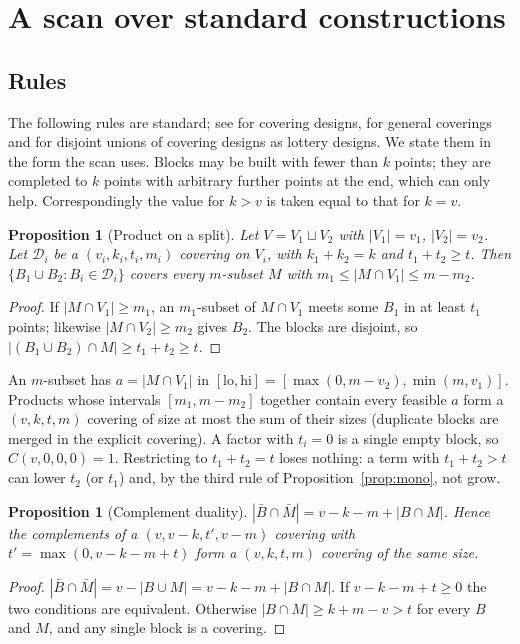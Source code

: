 \documentclass[11pt]{article}
\newtheorem{proposition}[lemma]{Proposition}
\theoremstyle{remark}
\begin{document}
\section{A scan over standard constructions}\label{sec:constructions}

\subsection{Rules}

The following rules are standard; see \cite{gkp1995} for covering designs, \cite{montecalvo2012} for general coverings
and \cite{cushing2024} for disjoint unions of covering designs as lottery designs. We state them in the form the scan
uses. Blocks may be built with fewer than $k$ points; they are completed to $k$ points with arbitrary further points at
the end, which can only help. Correspondingly the value for $k>v$ is taken equal to that for $k=v$.

\begin{proposition}[Product on a split]\label{prop:product}
Let $V=V_1\sqcup V_2$ with $|V_1|=v_1$, $|V_2|=v_2$. Let $\mathcal{D}_i$ be a $(v_i,k_i,t_i,m_i)$ covering on $V_i$,
with $k_1+k_2=k$ and $t_1+t_2\ge t$. Then $\{B_1\cup B_2:B_i\in\mathcal{D}_i\}$ covers every $m$-subset $M$ with
$m_1\le |M\cap V_1|\le m-m_2$.
\end{proposition}
\begin{proof}
If $|M\cap V_1|\ge m_1$, an $m_1$-subset of $M\cap V_1$ meets some $B_1$ in at least $t_1$ points; likewise
$|M\cap V_2|\ge m_2$ gives $B_2$. The blocks are disjoint, so $|(B_1\cup B_2)\cap M|\ge t_1+t_2\ge t$.
\end{proof}

An $m$-subset has $a=|M\cap V_1|$ in $[\mathrm{lo},\mathrm{hi}]=[\max(0,m-v_2),\min(m,v_1)]$. Products whose intervals
$[m_1,m-m_2]$ together contain every feasible $a$ form a $(v,k,t,m)$ covering of size at most the sum of their sizes
(duplicate blocks are merged in the explicit covering). A factor with $t_i=0$ is a single empty block, so
$C(v,0,0,0)=1$. Restricting to $t_1+t_2=t$ loses nothing: a term with $t_1+t_2>t$ can lower $t_2$ (or $t_1$) and, by
the third rule of Proposition~\ref{prop:mono}, not grow.

\begin{proposition}[Complement duality]\label{prop:dual}
$|\bar B\cap\bar M| = v-k-m+|B\cap M|$. Hence the complements of a $(v,v-k,t',v-m)$ covering with
$t'=\max(0,v-k-m+t)$ form a $(v,k,t,m)$ covering of the same size.
\end{proposition}
\begin{proof}
$|\bar B\cap\bar M|=v-|B\cup M|=v-k-m+|B\cap M|$. If $v-k-m+t\ge 0$ the two conditions are equivalent. Otherwise
$|B\cap M|\ge k+m-v>t$ for every $B$ and $M$, and any single block is a covering.
\end{proof}
\end{document}
